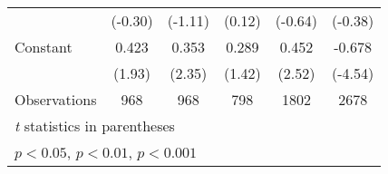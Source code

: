 {\begin{longtable}{l*{5}{c}}
                &  (-0.30)         &  (-1.11)         &   (0.12)         &  (-0.64)         &  (-0.38)         \\
[1em]
Constant        &    0.423         &    0.353\sym{*}  &    0.289         &    0.452\sym{*}  &   -0.678\sym{***}\\
                &   (1.93)         &   (2.35)         &   (1.42)         &   (2.52)         &  (-4.54)         \\
\hline
Observations    &      968         &      968         &      798         &     1802         &     2678         \\
\hline\hline
\multicolumn{6}{l}{\footnotesize \textit{t} statistics in parentheses}\\
\multicolumn{6}{l}{\footnotesize \sym{*} \(p<0.05\), \sym{**} \(p<0.01\), \sym{***} \(p<0.001\)}\\
\end{longtable}
}
